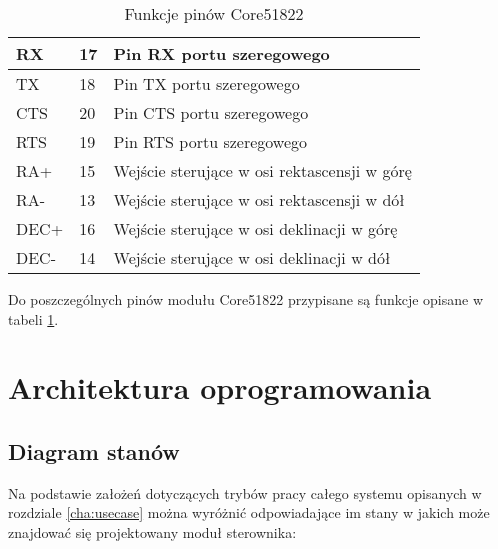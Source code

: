 \begin{table}[h]
\begin{tabularx}{\linewidth}{|l|l|X|}
	\hline RX & 17 & Pin RX portu szeregowego \\

	\hline TX & 18 & Pin TX portu szeregowego \\ 

	\hline CTS & 20 & Pin CTS portu szeregowego \\

	\hline RTS  & 19 & Pin RTS portu szeregowego \\

	\hline RA+ & 15 & Wejście sterujące w osi rektascensji w górę \\

	\hline RA- & 13 & Wejście sterujące w osi rektascensji w dół \\

	\hline DEC+ & 16 & Wejście sterujące w osi deklinacji w górę \\

	\hline DEC- & 14 & Wejście sterujące w osi deklinacji w dół \\

\hline \end{tabularx}

\caption{Funkcje pinów Core51822}

\label{tab:custom-pinout}

\end{table}

Do poszczególnych pinów modułu Core51822 przypisane są funkcje opisane w tabeli
\ref{tab:custom-pinout}.

\section{Architektura oprogramowania}

\subsection{Diagram stanów}

Na podstawie założeń dotyczących trybów pracy całego systemu opisanych
w rozdziale \ref{cha:usecase} można wyróżnić odpowiadające im stany w jakich
może znajdować się projektowany moduł sterownika:

